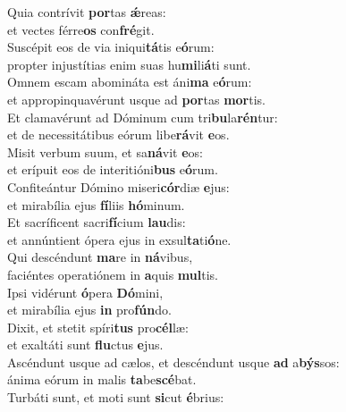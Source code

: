 \evenverse Quia contrívit \textbf{por}tas \textbf{ǽ}reas:~\*\\
\evenverse et vectes férre\textbf{os} con\textbf{fré}git.\\
\oddverse Suscépit eos de via iniqui\textbf{tá}tis e\textbf{ó}rum:~\*\\
\oddverse propter injustítias enim suas hu\textbf{mi}li\textbf{á}ti sunt.\\
\evenverse Omnem escam abomináta est áni\textbf{ma} e\textbf{ó}rum:~\*\\
\evenverse et appropinquavérunt usque ad \textbf{por}tas \textbf{mor}tis.\\
\oddverse Et clamavérunt ad Dóminum cum tri\textbf{bu}la\textbf{rén}tur:~\*\\
\oddverse et de necessitátibus eórum libe\textbf{rá}vit \textbf{e}os.\\
\evenverse Misit verbum suum, et sa\textbf{ná}vit \textbf{e}os:~\*\\
\evenverse et erípuit eos de interitióni\textbf{bus} e\textbf{ó}rum.\\
\oddverse Confiteántur Dómino miseri\textbf{cór}diæ \textbf{e}jus:~\*\\
\oddverse et mirabília ejus \textbf{fí}liis \textbf{hó}minum.\\
\evenverse Et sacríficent sacri\textbf{fí}cium \textbf{lau}dis:~\*\\
\evenverse et annúntient ópera ejus in exsul\textbf{ta}ti\textbf{ó}ne.\\
\oddverse Qui descéndunt \textbf{ma}re in \textbf{ná}vibus,~\*\\
\oddverse faciéntes operatiónem in \textbf{a}quis \textbf{mul}tis.\\
\evenverse Ipsi vidérunt \textbf{ó}pera \textbf{Dó}mini,~\*\\
\evenverse et mirabília ejus \textbf{in} pro\textbf{fún}do.\\
\oddverse Dixit, et stetit spíri\textbf{tus} pro\textbf{cél}læ:~\*\\
\oddverse et exaltáti sunt \textbf{flu}ctus \textbf{e}jus.\\
\evenverse Ascéndunt usque ad cælos, et descéndunt usque \textbf{ad} a\textbf{býs}sos:~\*\\
\evenverse ánima eórum in malis \textbf{ta}be\textbf{scé}bat.\\
\oddverse Turbáti sunt, et moti sunt \textbf{si}cut \textbf{é}brius:~\*\\
